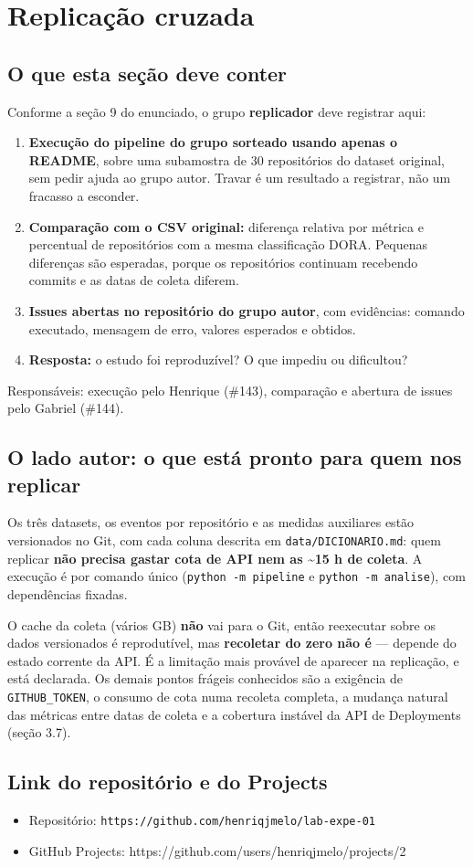 \documentclass[12pt]{article}
\begin{document}
\section{Replicação cruzada}

\subsection{O que esta seção deve conter}

Conforme a seção 9 do enunciado, o grupo \textbf{replicador} deve registrar aqui:

\begin{enumerate}
  \item \textbf{Execução do pipeline do grupo sorteado usando apenas o README}, sobre uma subamostra de 30 repositórios do dataset original, sem pedir ajuda ao grupo autor. Travar é um resultado a registrar, não um fracasso a esconder.
  \item \textbf{Comparação com o CSV original:} diferença relativa por métrica e percentual de repositórios com a mesma classificação DORA. Pequenas diferenças são esperadas, porque os repositórios continuam recebendo commits e as datas de coleta diferem.
  \item \textbf{Issues abertas no repositório do grupo autor}, com evidências: comando executado, mensagem de erro, valores esperados e obtidos.
  \item \textbf{Resposta:} o estudo foi reproduzível? O que impediu ou dificultou?
\end{enumerate}

Responsáveis: execução pelo Henrique (\#143), comparação e abertura de issues pelo Gabriel (\#144).

\subsection{O lado autor: o que está pronto para quem nos replicar}

Os três datasets, os eventos por repositório e as medidas auxiliares estão versionados no Git, com cada coluna descrita em \texttt{data/DICIONARIO.md}: quem replicar \textbf{não precisa gastar cota de API nem as \textasciitilde{}15 h de coleta}. A execução é por comando único (\texttt{python -m pipeline} e \texttt{python -m analise}), com dependências fixadas.

O cache da coleta (vários GB) \textbf{não} vai para o Git, então reexecutar sobre os dados versionados é reprodutível, mas \textbf{recoletar do zero não é} — depende do estado corrente da API. É a limitação mais provável de aparecer na replicação, e está declarada. Os demais pontos frágeis conhecidos são a exigência de \texttt{GITHUB\_TOKEN}, o consumo de cota numa recoleta completa, a mudança natural das métricas entre datas de coleta e a cobertura instável da API de Deployments (seção 3.7).

\subsection{Link do repositório e do Projects}

\begin{itemize}
  \item Repositório: \texttt{https://github.com/henriqjmelo/lab-expe-01}
  \item GitHub Projects: https://github.com/users/henriqjmelo/projects/2
\end{itemize}
\end{document}
